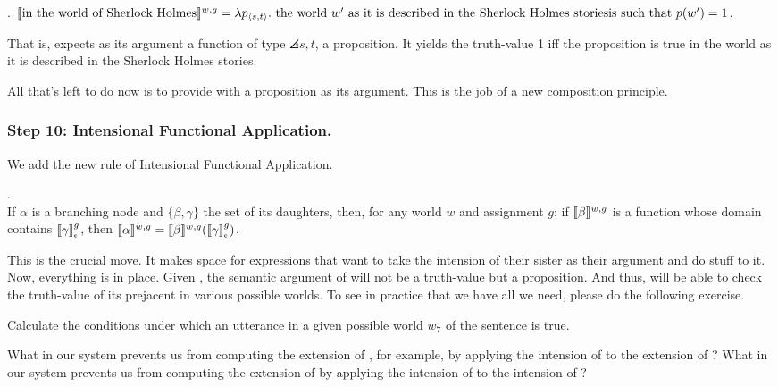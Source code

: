 \ex. $\llbracket \mbox{in the world of Sherlock Holmes} \rrbracket^{w,g} =\\
\lambda p_{\langle s,t \rangle}.\ \mbox{the world } w' \mbox{ as it is described in the Sherlock Holmes stories}\\
\mbox{is such that } p(w') = 1$.

That is,  expects as its
argument a function of type $\angles{s,t}$, a proposition. It yields
the truth-value 1 iff the proposition is true in the world as it is
described in the Sherlock Holmes stories.

All that's left to do now is to provide  with a proposition as its argument. This is the job
of a new composition principle.

\subsubsection{Step 10: Intensional Functional Application.} \label{sec:intens-funct-appl}

We add the new rule of Intensional Functional Application.

\ex. \\
If $\alpha$ is a branching node and $\{\beta, \gamma\}$ the set of its daughters, then, for any world $w$ and assignment $g$: if $\llbracket \beta \rrbracket^{w,g}$ is a function whose domain contains $\svcent{\gamma}^g$, then $\sv{\alpha}^{w,g} = \sv{\beta}^{w,g} (\svcent{\gamma}^g)$.

This is the crucial move. It makes space for expressions that want to
take the intension of their sister as their argument and do stuff to
it. Now, everything is in place. Given \LLast, the semantic argument
of  will not be a
truth-value but a proposition. And thus,  will be able to check the truth-value of its
prejacent in various possible worlds. To see in practice that we have
all we need, please do the following exercise.

\begin{exercise}
  Calculate the conditions under which an utterance in a given
  possible world $w_7$ of the sentence  is true. \eex
\end{exercise}

\begin{exercise}
  What in our system prevents us from computing the extension of
  , for example, by applying the intension
  of  to the extension of ? What
  in our system prevents us from computing the extension of
   by applying the intension of
   to the intension of ? \eex
\end{exercise}

